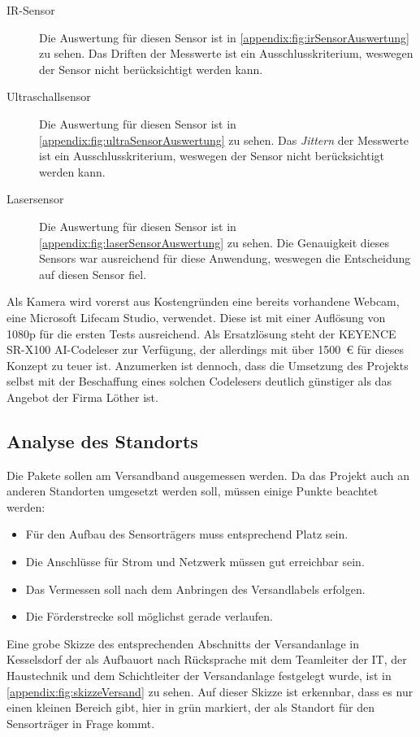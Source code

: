 \begin{description}
  \item[\ac{IR}-Sensor] Die Auswertung für diesen Sensor ist in \vref{appendix:fig:irSensorAuswertung} zu sehen. Das Driften der Messwerte ist ein Ausschlusskriterium, weswegen der Sensor nicht berücksichtigt werden kann.
  \item[Ultraschallsensor] Die Auswertung für diesen Sensor ist in \vref{appendix:fig:ultraSensorAuswertung} zu sehen. Das \textit{\gls{Jittern}} der Messwerte ist ein Ausschlusskriterium, weswegen der Sensor nicht berücksichtigt werden kann.
  \item[Lasersensor] Die Auswertung für diesen Sensor ist in \vref{appendix:fig:laserSensorAuswertung} zu sehen. Die Genauigkeit dieses Sensors war ausreichend für diese Anwendung, weswegen die Entscheidung auf diesen Sensor fiel.
\end{description}

Als Kamera wird vorerst aus Kostengründen eine bereits vorhandene Webcam, eine Microsoft Lifecam Studio, verwendet. Diese ist mit einer Auflösung von 1080p für die ersten Tests ausreichend. Als Ersatzlösung steht der KEYENCE SR-X100 AI-Codeleser zur Verfügung, der allerdings mit über \SI{1500}{€} für dieses Konzept zu teuer ist. Anzumerken ist dennoch, dass die Umsetzung des Projekts selbst mit der Beschaffung eines solchen Codelesers deutlich günstiger als das Angebot der Firma Löther ist.


\subsection{Analyse des Standorts}\label{ssec:analyse:standort}

Die Pakete sollen am Versandband ausgemessen werden. Da das Projekt auch an anderen Standorten umgesetzt werden soll, müssen einige Punkte beachtet werden:

\begin{itemize}
  \item Für den Aufbau des Sensorträgers muss entsprechend Platz sein.
  \item Die Anschlüsse für Strom und Netzwerk müssen gut erreichbar sein.
  \item Das Vermessen soll nach dem Anbringen des Versandlabels erfolgen.
  \item Die Förderstrecke soll möglichst gerade verlaufen.
\end{itemize}

Eine grobe Skizze des entsprechenden Abschnitts der Versandanlage in Kesselsdorf der als Aufbauort nach Rücksprache mit dem Teamleiter der IT, der Haustechnik und dem Schichtleiter der Versandanlage festgelegt wurde, ist in \vref{appendix:fig:skizzeVersand} zu sehen. Auf dieser Skizze ist erkennbar, dass es nur einen kleinen Bereich gibt, hier in grün markiert, der als Standort für den Sensorträger in Frage kommt.